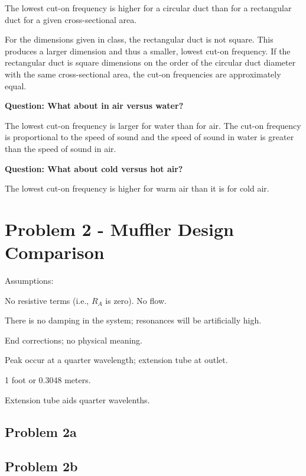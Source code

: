  The lowest cut-on frequency is higher for a circular duct than for a
 rectangular duct for a given cross-sectional area.

 For the dimensions given in class, the rectangular duct is not square.
 This produces a larger dimension and thus a smaller, lowest cut-on
 frequency.  If the rectangular duct is square dimensions on the order
 of the circular duct diameter with the same cross-sectional area, the
 cut-on frequencies are approximately equal.



\vspace{0.25cm}
\textbf{Question:  What about in air versus water?}

 The lowest cut-on frequency is larger for water than for air.  The cut-on
 frequency is proportional to the speed of sound and the speed of sound in
 water is greater than the speed of sound in air.



\vspace{0.25cm}
\textbf{Question:  What about cold versus hot air?}

 The lowest cut-on frequency is higher for warm air than it is for cold air.









\newpage
\section*{Problem 2 - Muffler Design Comparison}

 Assumptions:

   No resistive terms (i.e., $R_A$ is zero).
   No flow.

There is no damping in the system;  resonances will be artificially high.


 End corrections;  no physical meaning.


 Peak occur at a quarter wavelength;  extension tube at outlet.

 1 foot or 0.3048 meters.


 Extension tube aids quarter wavelenths.


\subsection*{Problem 2a}

\subsection*{Problem 2b}

